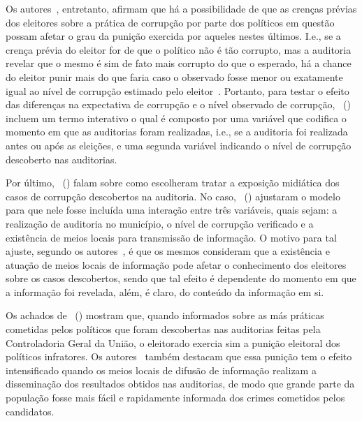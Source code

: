 \documentclass[
	12pt,				%
	openright,			%
	twoside,			%
	a4paper,			%
	openany,
	english,			%
	brazil				%
	]{abntex2}
\begin{document}
Os autores~\cite{ferraz2008exposing}, entretanto, afirmam que há a possibilidade de que as crenças prévias dos eleitores sobre a prática de corrupção por parte dos políticos em questão possam afetar o grau da punição exercida por aqueles nestes últimos. I.e., se a crença prévia do eleitor for de que o político não é tão corrupto, mas a auditoria revelar que o mesmo é sim de fato mais corrupto do que o esperado, há a chance do eleitor punir mais do que faria caso o observado fosse menor ou exatamente igual ao nível de corrupção estimado pelo eleitor~\cite{ferraz2008exposing}. Portanto, para testar o efeito das diferenças na expectativa de corrupção e o nível observado de corrupção, ~(\citeyear{ferraz2008exposing}) incluem um termo interativo o qual é composto por uma variável que codifica o momento em que as auditorias foram realizadas, i.e., se a auditoria foi realizada antes ou após as eleições, e uma segunda variável indicando o nível de corrupção descoberto nas auditorias.


Por último, ~(\citeyear{ferraz2008exposing}) falam sobre como escolheram tratar a exposição midiática dos casos de corrupção descobertos na auditoria. No caso, ~(\citeyear{ferraz2008exposing}) ajustaram o modelo para que nele fosse incluída uma interação entre três variáveis, quais sejam: a realização de auditoria no município, o nível de corrupção verificado e a existência de meios locais para transmissão de informação. O motivo para tal ajuste, segundo os autores~\cite{ferraz2008exposing}, é que os mesmos consideram que a existência e atuação de meios locais de informação pode afetar o conhecimento dos eleitores sobre os casos descobertos, sendo que tal efeito é dependente do momento em que a informação foi revelada, além, é claro, do conteúdo da informação em si.

Os achados de ~(\citeyear{ferraz2008exposing}) mostram que, quando informados sobre as más práticas cometidas pelos políticos que foram descobertas nas auditorias feitas pela Controladoria Geral da União, o eleitorado exercia sim a punição eleitoral dos políticos infratores. Os autores~\cite{ferraz2008exposing} também destacam que essa punição tem o efeito intensificado quando os meios locais de difusão de informação realizam a disseminação dos resultados obtidos nas auditorias, de modo que grande parte da população fosse mais fácil e rapidamente informada dos crimes cometidos pelos candidatos.
\end{document}

